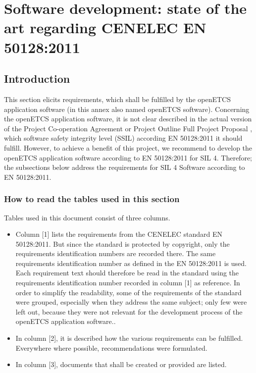 \documentclass{template/openetcs_report}
\begin{document}
\chapter{Software development: state of the art regarding CENELEC EN 50128:2011}
\label{annexB}
\section{Introduction}
This section elicits requirements, which shall be fulfilled by the openETCS application software (in this annex also named openETCS software).
Concerning the openETCS application software, it is not clear described in the actual version of the Project Co-operation Agreement \cite{PCA12} or Project Outline Full Project Proposal \cite{FPP13}, which software safety integrity level (SSIL) according EN 50128:2011 it should fulfill. However, to achieve a benefit of this project, we recommend to develop the openETCS application software according to EN 50128:2011 for SIL 4. 
Therefore; the subsections below address the requirements for SIL 4 Software according to EN 50128:2011.

\subsection{How to read the tables used in this section}
Tables used in this document consist of three columns.
\begin{itemize}\itemsep=0pt
  \item Column [1] lists the requirements from the CENELEC standard EN 50128:2011. But since the standard is protected by copyright, only the requirements identification numbers are recorded there. The same requirements identification number as defined in the EN 50128:2011 is used. Each requirement text should therefore be read in the standard using the requirements identification number recorded in column [1] as reference.
In order to simplify the readability, some of the requirements of the standard were grouped, especially when they address the same subject; only few were left out, because they were not relevant for the development process of the openETCS application software..
  \item In column [2], it is described how the various requirements can be fulfilled. Everywhere where possible, recommendations were formulated.
  \item In column [3], documents that shall be created or provided are listed.
\end{itemize}
\end{document}
